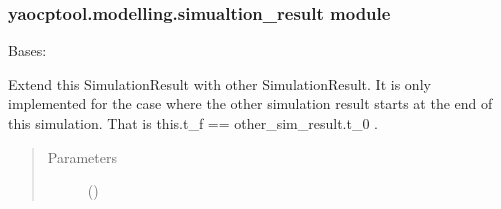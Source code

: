 \documentclass[letterpaper,10pt,english]{sphinxmanual}
\begin{document}
\subsubsection{yaocptool.modelling.simualtion\_result module}
\label{\detokenize{yaocptool.modelling:module-yaocptool.modelling.simualtion_result}}\label{\detokenize{yaocptool.modelling:yaocptool-modelling-simualtion-result-module}}

\begin{fulllineitems}
\label{\detokenize{yaocptool.modelling:yaocptool.modelling.simualtion_result.SimulationResult}}
Bases: {\hyperref[\detokenize{yaocptool.modelling:yaocptool.modelling.dataset.DataSet}]{}}

\begin{fulllineitems}
\label{\detokenize{yaocptool.modelling:yaocptool.modelling.simualtion_result.SimulationResult.__init__}}
\end{fulllineitems}


\begin{fulllineitems}
\label{\detokenize{yaocptool.modelling:yaocptool.modelling.simualtion_result.SimulationResult.extend}}
Extend this SimulationResult with other SimulationResult.
It is only implemented for the case where the other simulation result starts at the end of this
simulation. That is this.t\_f == other\_sim\_result.t\_0 .
\begin{quote}\begin{description}
\item[{Parameters}] \leavevmode
{} ({\hyperref[\detokenize{yaocptool.modelling:yaocptool.modelling.simualtion_result.SimulationResult}]{}}) \textendash{} 


\end{description}
\end{quote}
\end{fulllineitems}
\end{fulllineitems}
\end{document}

